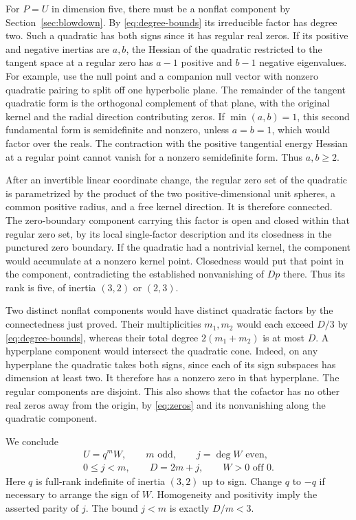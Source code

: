 \documentclass[11pt]{amsart}
\begin{document}
For \(P=U\) in dimension five, there must be a nonflat component
by Section~\ref{sec:blowdown}. By \eqref{eq:degree-bounds} its irreducible factor has degree two. Such
a quadratic has both signs since it has regular real zeros. If its
positive and negative inertias are \(a,b\), the Hessian of the
quadratic restricted to the tangent space at a regular zero has
\(a-1\) positive and \(b-1\) negative eigenvalues. For example, use
the null point and a companion null vector with nonzero quadratic
pairing to split off one hyperbolic plane. The remainder of the
tangent quadratic form is the orthogonal complement of that plane,
with the original kernel and the radial direction contributing
zeros. If \(\min(a,b)=1\), this second fundamental form is semidefinite
and nonzero, unless \(a=b=1\), which would factor over the reals.
The contraction with the positive tangential energy Hessian at a
regular point cannot vanish for a nonzero semidefinite form.
Thus \(a,b\ge2\).

After an invertible linear coordinate change, the regular zero set
of the quadratic is parametrized by the
product of the two positive-dimensional unit spheres, a common
positive radius, and a free kernel direction. It is therefore connected.
The zero-boundary
component carrying this factor is open and closed within that regular
zero set, by its local single-factor description and its closedness
in the punctured zero boundary. If the quadratic had a nontrivial
kernel, the component would accumulate at a nonzero kernel point.
Closedness would put that point in the component, contradicting
the established nonvanishing of \(Dp\) there. Thus its rank is
five, of inertia \((3,2)\) or \((2,3)\).

Two distinct nonflat components would have distinct quadratic
factors by the connectedness just proved. Their multiplicities
\(m_1,m_2\) would each exceed \(D/3\) by \eqref{eq:degree-bounds}, whereas their total
degree \(2(m_1+m_2)\) is at most \(D\). A hyperplane component
would intersect the quadratic cone. Indeed, on any hyperplane
the quadratic takes both signs, since each of its sign subspaces
has dimension at least two. It therefore has a nonzero zero in
that hyperplane. The regular components are disjoint. This also
shows that the cofactor has no other real zeros away from the
origin, by \eqref{eq:zeros} and its nonvanishing along the quadratic component.

We conclude
\begin{equation}\label{eq:factorization}
 \begin{gathered}
 U=q^m W,\qquad m\text{ odd},\qquad j=\deg W\text{ even},\\
 0\le j<m,\qquad D=2m+j,\qquad W>0\text{ off }0.
 \end{gathered}
\end{equation}
Here \(q\) is full-rank indefinite of inertia \((3,2)\) up to sign.
Change \(q\) to \(-q\) if necessary to arrange the sign of \(W\).
Homogeneity and positivity imply the asserted parity of \(j\).
The bound \(j<m\) is exactly \(D/m<3\).
\end{document}
